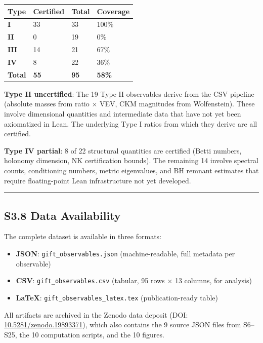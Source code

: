 \documentclass[11pt,a4paper]{article}
\begin{document}
{{{{{{\def\LTcaptype{none} %
\begin{longtable}[]{@{}llll@{}}
\toprule\noalign{}
Type & Certified & Total & Coverage \\
\midrule\noalign{}
\endhead
\bottomrule\noalign{}
\endlastfoot
\textbf{I} & 33 & 33 & 100\% \\
\textbf{II} & 0 & 19 & 0\% \\
\textbf{III} & 14 & 21 & 67\% \\
\textbf{IV} & 8 & 22 & 36\% \\
\textbf{Total} & \textbf{55} & \textbf{95} & \textbf{58\%} \\
\end{longtable}
\textbf{Type II uncertified}: The 19 Type II observables derive from the CSV pipeline (absolute masses from ratio × VEV, CKM magnitudes from Wolfenstein). These involve dimensional quantities and intermediate data that have not yet been axiomatized in Lean. The underlying Type I ratios from which they derive are all certified.

\textbf{Type IV partial}: 8 of 22 structural quantities are certified (Betti numbers, holonomy dimension, NK certification bounds). The remaining 14 involve spectral counts, conditioning numbers, metric eigenvalues, and BH remnant estimates that require floating-point Lean infrastructure not yet developed.

\begin{center}\rule{0.5\linewidth}{0.5pt}\end{center}

\subsection{S3.8 Data Availability}\label{s3.8-data-availability}

The complete dataset is available in three formats:

\begin{itemize}

\item
  \textbf{JSON}: \texttt{gift\_observables.json} (machine-readable, full metadata per observable)
\item
  \textbf{CSV}: \texttt{gift\_observables.csv} (tabular, 95 rows × 13 columns, for analysis)
\item
  \textbf{LaTeX}: \texttt{gift\_observables\_latex.tex} (publication-ready table)
\end{itemize}

All artifacts are archived in the Zenodo data deposit (DOI: \href{https://doi.org/10.5281/zenodo.19893371}{10.5281/zenodo.19893371}), which also contains the 9 source JSON files from S6--S25, the 10 computation scripts, and the 10 figures.

}}}}}}
\end{document}
